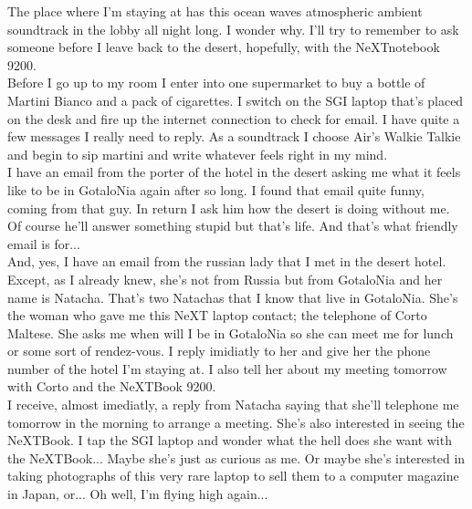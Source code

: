 \documentclass[11pt,twoside,a4paper]{book}
\begin{document}
\begin{multicols*}{2}
The place where I'm staying at has this ocean waves atmospheric ambient soundtrack in the lobby all night long. I wonder why. I'll try to remember to ask someone before I leave back to the desert, hopefully, with the NeXTnotebook 9200. ~\\

Before I go up to my room I enter into one supermarket to buy a bottle of Martini Bianco and a pack of cigarettes. I switch on the SGI laptop that's placed on the desk and fire up the internet connection to check for email. I have quite a few messages I really need to reply. As a soundtrack I choose Air's Walkie Talkie and begin to sip martini and write whatever feels right in my mind. ~\\

I have an email from the porter of the hotel in the desert asking me what it feels like to be in GotaloNia again after so long. I found that email quite funny, coming from that guy. In return I ask him how the desert is doing without me. Of course he'll answer something stupid but that's life. And that's what friendly email is for... ~\\

And, yes, I have an email from the russian lady that I met in the desert hotel. Except, as I already knew, she's not from Russia but from GotaloNia and her name is Natacha. That's two Natachas that I know that live in GotaloNia. She's the woman who gave me this NeXT laptop contact; the telephone of Corto Maltese. She asks me when will I be in GotaloNia so she can meet me for lunch or some sort of rendez-vous. I reply imidiatly to her and give her the phone number of the hotel I'm staying at. I also tell her about my meeting tomorrow with Corto and the NeXTBook 9200. ~\\


I receive, almost imediatly, a reply from Natacha saying that she'll telephone me tomorrow in the morning to arrange a meeting. She's also interested in seeing the NeXTBook. I tap the SGI laptop and wonder what the hell does she want with the NeXTBook... Maybe she's just as curious as me. Or maybe she's interested in taking photographs of this very rare laptop to sell them to a computer magazine in Japan, or... Oh well, I'm flying high again... ~\\


\end{multicols*}
\end{document}
